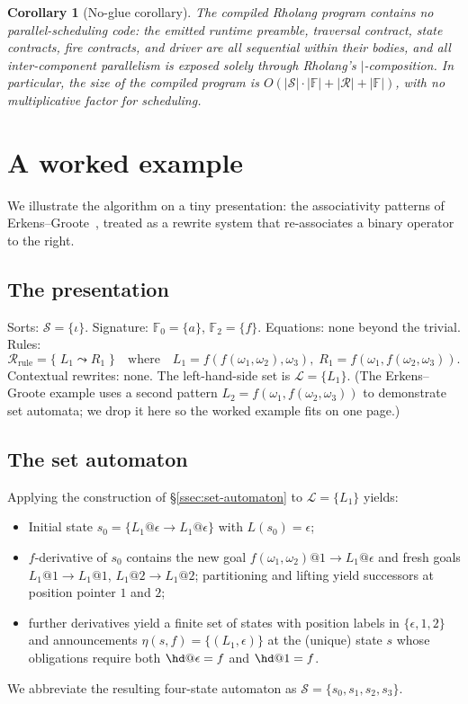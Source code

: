 \documentclass[11pt]{article}
\theoremstyle{plain}
\newtheorem{corollary}[theorem]{Corollary}
\theoremstyle{definition}
\theoremstyle{remark}
\newcommand{\rew}{\leadsto}
\newcommand{\States}{\mathcal{S}}
\newcommand{\Lhs}{\mathcal{L}}
\begin{document}
\begin{corollary}[No-glue corollary]\label{cor:no-glue}
The compiled Rholang program contains no parallel-scheduling code: the
emitted runtime preamble, traversal contract, state contracts, fire
contracts, and driver are all sequential within their bodies, and all
inter-component parallelism is exposed solely through Rholang's
$\mid$-composition. In particular, the size of the compiled program is
$O(|\States| \cdot |\mathbb{F}| + |\mathcal{R}| + |\mathbb{F}|)$, with no
multiplicative factor for scheduling.
\end{corollary}

\section{A worked example}\label{sec:example}

We illustrate the algorithm on a tiny presentation: the associativity
patterns of Erkens--Groote~\cite[\S3]{ErkensGroote2021}, treated as a
rewrite system that re-associates a binary operator to the right.

\subsection{The presentation}

Sorts: $\mathcal{S} = \{\iota\}$. Signature: $\mathbb{F}_0 = \{a\}$,
$\mathbb{F}_2 = \{f\}$. Equations: none beyond the trivial. Rules:
\[
  \mathcal{R}_{\mathrm{rule}} = \{\; L_1 \rew R_1 \;\}
  \quad\text{where}\quad
  L_1 = f(f(\omega_1, \omega_2), \omega_3),\;
  R_1 = f(\omega_1, f(\omega_2, \omega_3)).
\]
Contextual rewrites: none. The left-hand-side set is
$\Lhs = \{L_1\}$. (The Erkens--Groote example uses a second pattern
$L_2 = f(\omega_1, f(\omega_2, \omega_3))$ to demonstrate set automata;
we drop it here so the worked example fits on one page.)

\subsection{The set automaton}

Applying the construction of \S\ref{ssec:set-automaton} to
$\Lhs = \{L_1\}$ yields:
\begin{itemize}[leftmargin=*]
  \item Initial state $s_0 = \{L_1 @ \epsilon \to L_1 @ \epsilon\}$ with
        $L(s_0) = \epsilon$;
  \item $f$-derivative of $s_0$ contains the new goal $f(\omega_1, \omega_2) @ 1 \to L_1 @ \epsilon$
        and fresh goals $L_1 @ 1 \to L_1 @ 1$, $L_1 @ 2 \to L_1 @ 2$;
        partitioning and lifting yield successors at position pointer
        $1$ and $2$;
  \item further derivatives yield a finite set of states with
        position labels in $\{\epsilon, 1, 2\}$ and announcements
        $\eta(s, f) = \{(L_1, \epsilon)\}$ at the (unique) state $s$
        whose obligations require both $\hd@\epsilon = f$ and
        $\hd@1 = f$.
\end{itemize}
We abbreviate the resulting four-state automaton as
$\States = \{s_0, s_1, s_2, s_3\}$.
\end{document}
